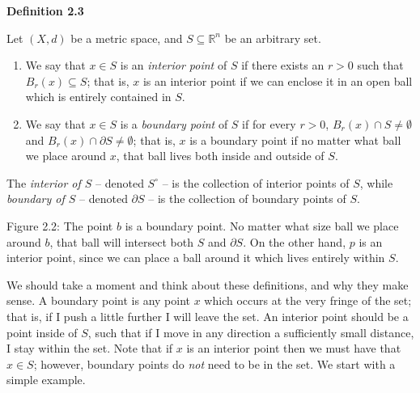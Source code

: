\documentclass{article}
\theoremstyle{definition}
\numberwithin{equation}{section}
\begin{document}
\begin{mydefbox}
\textbf{Definition 2.3}

Let $(X,d)$ be a metric space, and $S \subseteq \mathbb{R}^n$ be an arbitrary set. 

\begin{enumerate}
    \item We say that $x \in S$ is an \emph{interior point} of $S$ if there exists an $r > 0$ such that $B_r(x) \subseteq S$; that is, $x$ is an interior point if we can enclose it in an open ball which is entirely contained in $S$.
    \item We say that $x \in S$ is a \emph{boundary point} of $S$ if for every $r > 0$, $B_r(x) \cap S \neq \emptyset$ and $B_r(x) \cap \partial S \neq \emptyset$; that is, $x$ is a boundary point if no matter what ball we place around $x$, that ball lives both inside and outside of $S$.
\end{enumerate}
\end{mydefbox}

The \emph{interior of $S$} -- denoted $S^{\circ}$ -- is the collection of interior points of $S$, while \emph{boundary of $S$} -- denoted $\partial S$ -- is the collection of boundary points of $S$.

\begin{center}

Figure 2.2: The point $b$ is a boundary point. No matter what size ball we place around $b$, that ball will intersect both $S$ and $\partial S$. On the other hand, $p$ is an interior point, since we can place a ball around it which lives entirely within $S$. 
\end{center}

We should take a moment and think about these definitions, and why they make sense. A boundary point is any point $x$ which occurs at the very fringe of the set; that is, if I push a little further I will leave the set. An interior point should be a point inside of $S$, such that if I move in any direction a sufficiently small distance, I stay within the set. Note that if $x$ is an interior point then we must have that $x \in S$; however, boundary points do \emph{not} need to be in the set. We start with a simple example.
\end{document}
